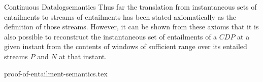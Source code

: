 \begin{nestedsection}{Continuous Datalog}{semantics}
	Thus far the translation from instantaneous sets of entailments to streams of entailments has been stated axiomatically as the definition of those streams.
	However, it can be shown from these axioms that it is also possible to reconstruct the instantaneous set of entailments of a ${CDP}$ at a given instant from the contents of windows of sufficient range over its entailed streams $P$ and $N$ at that instant.

	{proof-of-entailment-semantics.tex}
\end{nestedsection}